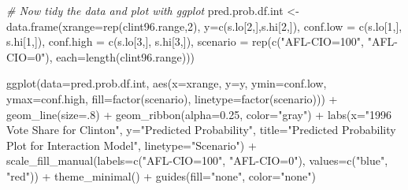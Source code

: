 \documentclass[
]{article}
\newenvironment{Shaded}{\begin{snugshade}}{\end{snugshade}}
\newcommand{\AttributeTok}[1]{\textcolor[rgb]{0.77,0.63,0.00}{#1}}
\newcommand{\CommentTok}[1]{\textcolor[rgb]{0.56,0.35,0.01}{\textit{#1}}}
\newcommand{\DecValTok}[1]{\textcolor[rgb]{0.00,0.00,0.81}{#1}}
\newcommand{\FloatTok}[1]{\textcolor[rgb]{0.00,0.00,0.81}{#1}}
\newcommand{\FunctionTok}[1]{\textcolor[rgb]{0.00,0.00,0.00}{#1}}
\newcommand{\NormalTok}[1]{#1}
\newcommand{\OtherTok}[1]{\textcolor[rgb]{0.56,0.35,0.01}{#1}}
\newcommand{\SpecialCharTok}[1]{\textcolor[rgb]{0.00,0.00,0.00}{#1}}
\newcommand{\StringTok}[1]{\textcolor[rgb]{0.31,0.60,0.02}{#1}}
\begin{document}
\begin{Shaded}
\begin{Highlighting}[]
\CommentTok{\# Now tidy the data and plot with ggplot}
\NormalTok{pred.prob.df.int }\OtherTok{\textless{}{-}} \FunctionTok{data.frame}\NormalTok{(}\AttributeTok{xrange=}\FunctionTok{rep}\NormalTok{(clint96.range,}\DecValTok{2}\NormalTok{), }
                           \AttributeTok{y=}\FunctionTok{c}\NormalTok{(s.lo[}\DecValTok{2}\NormalTok{,],s.hi[}\DecValTok{2}\NormalTok{,]),}
                           \AttributeTok{conf.low =} \FunctionTok{c}\NormalTok{(s.lo[}\DecValTok{1}\NormalTok{,], s.hi[}\DecValTok{1}\NormalTok{,]),}
                           \AttributeTok{conf.high =} \FunctionTok{c}\NormalTok{(s.lo[}\DecValTok{3}\NormalTok{,], s.hi[}\DecValTok{3}\NormalTok{,]),}
                           \AttributeTok{scenario =} \FunctionTok{rep}\NormalTok{(}\FunctionTok{c}\NormalTok{(}\StringTok{"AFL{-}CIO=100"}\NormalTok{, }\StringTok{"AFL{-}CIO=0"}\NormalTok{), }
                                          \AttributeTok{each=}\FunctionTok{length}\NormalTok{(clint96.range)))}

\FunctionTok{ggplot}\NormalTok{(}\AttributeTok{data=}\NormalTok{pred.prob.df.int, }\FunctionTok{aes}\NormalTok{(}\AttributeTok{x=}\NormalTok{xrange, }\AttributeTok{y=}\NormalTok{y,}
                              \AttributeTok{ymin=}\NormalTok{conf.low,}
                              \AttributeTok{ymax=}\NormalTok{conf.high,}
                              \AttributeTok{fill=}\FunctionTok{factor}\NormalTok{(scenario),}
                              \AttributeTok{linetype=}\FunctionTok{factor}\NormalTok{(scenario))) }\SpecialCharTok{+}
  \FunctionTok{geom\_line}\NormalTok{(}\AttributeTok{size=}\NormalTok{.}\DecValTok{8}\NormalTok{) }\SpecialCharTok{+}
  \FunctionTok{geom\_ribbon}\NormalTok{(}\AttributeTok{alpha=}\FloatTok{0.25}\NormalTok{, }\AttributeTok{color=}\StringTok{"gray"}\NormalTok{) }\SpecialCharTok{+}
  \FunctionTok{labs}\NormalTok{(}\AttributeTok{x=}\StringTok{"1996 Vote Share for Clinton"}\NormalTok{, }\AttributeTok{y=}\StringTok{"Predicted Probability"}\NormalTok{,}
       \AttributeTok{title=}\StringTok{"Predicted Probability Plot for Interaction Model"}\NormalTok{, }\AttributeTok{linetype=}\StringTok{"Scenario"}\NormalTok{) }\SpecialCharTok{+}
  \FunctionTok{scale\_fill\_manual}\NormalTok{(}\AttributeTok{labels=}\FunctionTok{c}\NormalTok{(}\StringTok{"AFL{-}CIO=100"}\NormalTok{, }\StringTok{"AFL{-}CIO=0"}\NormalTok{), }
                    \AttributeTok{values=}\FunctionTok{c}\NormalTok{(}\StringTok{"blue"}\NormalTok{, }\StringTok{"red"}\NormalTok{)) }\SpecialCharTok{+}
  \FunctionTok{theme\_minimal}\NormalTok{() }\SpecialCharTok{+}
  \FunctionTok{guides}\NormalTok{(}\AttributeTok{fill=}\StringTok{"none"}\NormalTok{, }\AttributeTok{color=}\StringTok{"none"}\NormalTok{)}
\end{Highlighting}
\end{Shaded}
\end{document}
